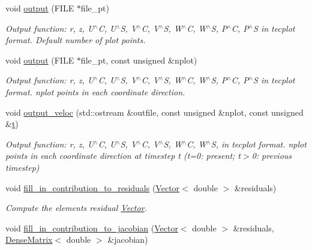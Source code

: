 \begin{DoxyCompactItemize}
void \hyperlink{classoomph_1_1LinearisedAxisymmetricNavierStokesEquations_a11528829faa67968adcb46ad7cfa1fb2}{output} (F\+I\+LE $\ast$file\+\_\+pt)
\begin{DoxyCompactList}\small\item\em Output function\+: r, z, U$^\wedge$C, U$^\wedge$S, V$^\wedge$C, V$^\wedge$S, W$^\wedge$C, W$^\wedge$S, P$^\wedge$C, P$^\wedge$S in tecplot format. Default number of plot points. \end{DoxyCompactList}\item 
void \hyperlink{classoomph_1_1LinearisedAxisymmetricNavierStokesEquations_a19ee5f4d8f6e187300f135b3eb69d194}{output} (F\+I\+LE $\ast$file\+\_\+pt, const unsigned \&nplot)
\begin{DoxyCompactList}\small\item\em Output function\+: r, z, U$^\wedge$C, U$^\wedge$S, V$^\wedge$C, V$^\wedge$S, W$^\wedge$C, W$^\wedge$S, P$^\wedge$C, P$^\wedge$S in tecplot format. nplot points in each coordinate direction. \end{DoxyCompactList}\item 
void \hyperlink{classoomph_1_1LinearisedAxisymmetricNavierStokesEquations_a94f9c04c4a728232376794e1ae415ade}{output\+\_\+veloc} (std\+::ostream \&outfile, const unsigned \&nplot, const unsigned \&\hyperlink{cfortran_8h_af6f0bd3dc13317f895c91323c25c2b8f}{t})
\begin{DoxyCompactList}\small\item\em Output function\+: r, z, U$^\wedge$C, U$^\wedge$S, V$^\wedge$C, V$^\wedge$S, W$^\wedge$C, W$^\wedge$S, in tecplot format. nplot points in each coordinate direction at timestep t (t=0\+: present; t$>$0\+: previous timestep) \end{DoxyCompactList}\item 
void \hyperlink{classoomph_1_1LinearisedAxisymmetricNavierStokesEquations_a0340774d1c5ceb93b90f037be3e44f3b}{fill\+\_\+in\+\_\+contribution\+\_\+to\+\_\+residuals} (\hyperlink{classoomph_1_1Vector}{Vector}$<$ double $>$ \&residuals)
\begin{DoxyCompactList}\small\item\em Compute the element\textquotesingle{}s residual \hyperlink{classoomph_1_1Vector}{Vector}. \end{DoxyCompactList}\item 
void \hyperlink{classoomph_1_1LinearisedAxisymmetricNavierStokesEquations_a65b02ed2b17993f07d26f3da3a176207}{fill\+\_\+in\+\_\+contribution\+\_\+to\+\_\+jacobian} (\hyperlink{classoomph_1_1Vector}{Vector}$<$ double $>$ \&residuals, \hyperlink{classoomph_1_1DenseMatrix}{Dense\+Matrix}$<$ double $>$ \&jacobian)

\end{DoxyCompactItemize}
